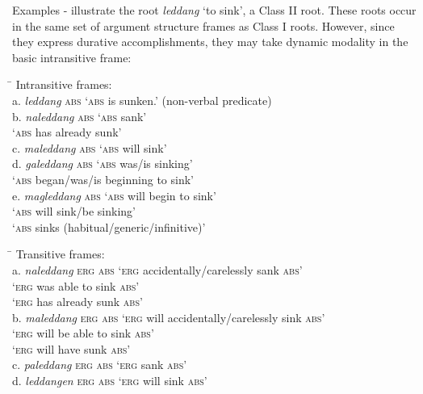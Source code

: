 Examples - illustrate the root \textit{leddang} ‘to sink’, a Class II root. These roots occur in the same set of argument structure frames as Class I roots. However, since they express durative accomplishments, they may take dynamic modality in the basic intransitive frame:
\ea
\label{bkm:Ref148516780}
\begin{tabbing}
\hspace{4.5cm} \= \kill
Intransitive frames: \\
a.  \textit{leddang} \textsc{abs} \> ‘\textsc{abs} is sunken.’ (non-verbal predicate) \\
b.  \textit{naleddang} \textsc{abs} \> ‘\textsc{abs} sank’ \\
\>       ‘\textsc{abs} has already sunk’ \\
c.  \textit{maleddang} \textsc{abs} \> ‘\textsc{abs} will sink’ \\
d.  \textit{galeddang} \textsc{abs} \> ‘\textsc{abs} was/is sinking’ \\
\>       ‘\textsc{abs} began/was/is beginning to sink’ \\
e.  \textit{magleddang} \textsc{abs} \> ‘\textsc{abs} will begin to sink’ \\
\>      ‘\textsc{abs} will sink/be sinking’ \\
\>      ‘\textsc{abs} sinks (habitual/generic/infinitive)’
\end{tabbing}
\z
\ea
\begin{tabbing}
\hspace{4.5cm} \= \kill
Transitive  frames: \\
a.  \textit{naleddang} \textsc{erg} \textsc{abs} \> ‘\textsc{erg} accidentally/carelessly sank \textsc{abs}’ \\
\>      ‘\textsc{erg} was able to sink \textsc{abs}’ \\
\>      ‘\textsc{erg} has already sunk \textsc{abs}’ \\
b.  \textit{maleddang} \textsc{erg} \textsc{abs} \> ‘\textsc{erg} will accidentally/carelessly sink \textsc{abs}’ \\
\>      ‘\textsc{erg} will be able to sink \textsc{abs}’ \\
\>      ‘\textsc{erg} will have sunk \textsc{abs}’ \\
c.  \textit{paleddang} \textsc{erg} \textsc{abs} \> ‘\textsc{erg} sank \textsc{abs}’ \\
d.  \textit{leddangen} \textsc{erg} \textsc{abs} \> ‘\textsc{erg} will sink \textsc{abs}’
\end{tabbing}
